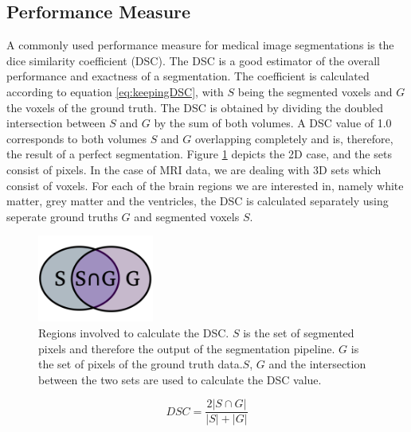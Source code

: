 \documentclass[journal]{IEEEtran}
\begin{document}
\subsection{Performance Measure}
A commonly used performance measure for medical image segmentations is the dice similarity coefficient (DSC). The DSC is a good estimator of the overall performance and exactness of a segmentation. The coefficient is calculated according to equation \ref{eq:keepingDSC}, with $S$ being the segmented voxels and $G$ the voxels of the ground truth. The DSC is obtained by dividing the doubled intersection between $S$ and $G$ by the sum of both volumes. A DSC value of 1.0 corresponds to both volumes $S$ and $G$ overlapping completely and is, therefore, the result of a perfect segmentation. Figure \ref{fig:dice} depicts the 2D case, and the sets consist of pixels. In the case of MRI data, we are dealing with 3D sets which consist of voxels. For each of the brain regions we are interested in, namely white matter, grey matter and the ventricles, the DSC is calculated separately using seperate ground truths $G$ and segmented voxels $S$.

\begin{figure}[!t]
\centering
\includegraphics[width=1.5in]{img/dice}
\caption{Regions involved to calculate the DSC. $S$ is the set of segmented pixels and therefore the output of the segmentation pipeline. $G$ is the set of pixels of the ground truth data.$S$, $G$ and the intersection between the two sets are used to calculate the DSC value.}
\label{fig:dice}
\end{figure}

\begin{equation}
    \label{eq:DSC}
    DSC = \frac{2\left |S\cap G  \right |}{\left |S  \right | + \left |G  \right |}
\end{equation}
\end{document}
